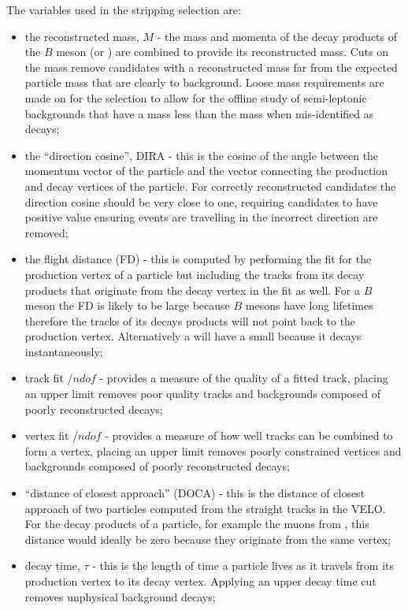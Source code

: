 The variables used in the stripping selection are:
\begin{itemize}
\item the reconstructed mass, $M$ - the mass and momenta of the decay products of the $B$ meson (or \jpsi) are combined to provide its reconstructed mass. Cuts on the mass remove candidates with a reconstructed mass far from the expected particle mass that are clearly to background. Loose mass requirements are made on for the \bsmumu selection to allow for the offline study of semi-leptonic backgrounds that have a mass less than the \bs mass when mis-identified as \bsmumu decays;
\item the ``direction cosine'', DIRA - this is the cosine of the angle between the momentum vector of the particle and the vector connecting the production and decay vertices of the particle. For correctly reconstructed candidates the direction cosine should be very close to one, requiring candidates to have positive value ensuring events are travelling in the incorrect direction are removed;
\item the flight distance (FD) \chisqd - this is computed by performing the fit for the production vertex of a particle but including the tracks from its decay products that originate from the decay vertex in the fit as well. For a $B$ meson the FD \chisqd is likely to be large because $B$ mesons have long lifetimes therefore the tracks of its decays products will not point back to the production vertex. Alternatively a \jpsi will have a small \chisqd because it decays instantaneously;
\item track fit \chisqd/$ndof$ - provides a measure of the quality of a fitted track, placing an upper limit removes poor quality tracks and backgrounds composed of poorly reconstructed decays;
\item vertex fit \chisqd/$ndof$ - provides a measure of how well tracks can be combined to form a vertex, placing an upper limit removes poorly constrained vertices and backgrounds composed of poorly reconstructed decays;
\item ``distance of closest approach'' (DOCA) - this is the distance of closest approach of two particles computed from the straight tracks in the VELO. For the decay products of a particle, for example the muons from \bsmumu, this distance would ideally be zero because they originate from the same vertex;
\item decay time, $\tau$ - this is the length of time a particle lives as it travels from its production vertex to its decay vertex. Applying an upper decay time cut removes unphysical background decays;

\end{itemize}
